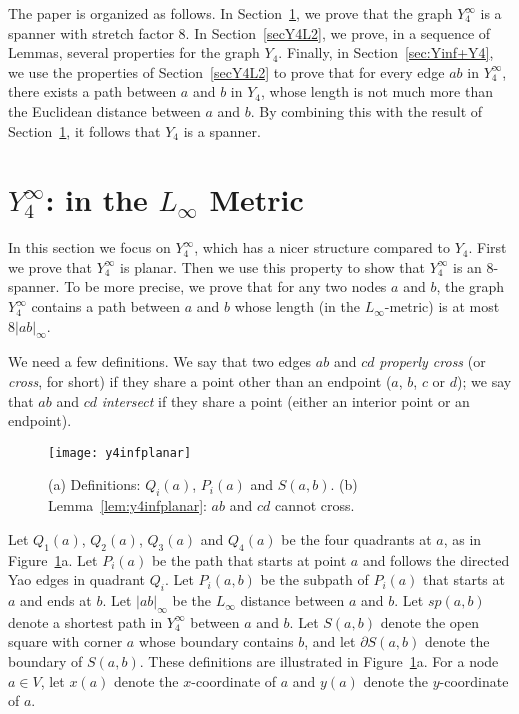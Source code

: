 \pdfoutput=1  \documentclass[11pt]{article}
\begin{document}
The paper is organized as follows.
In Section~\ref{sec:y4inf}, we prove that the graph $Y^\infty_4$ is a
spanner with stretch factor $8$.
In Section~\ref{secY4L2}, we prove, in a sequence of Lemmas, several
properties for the graph $Y_4$. Finally, in Section~\ref{sec:Yinf+Y4},
we use the properties of Section~\ref{secY4L2} to prove that for every
edge $ab$ in $Y^\infty_4$, there exists a path between $a$ and $b$ in
$Y_4$, whose length is not much more than the Euclidean distance between
$a$ and $b$. By combining this with the result of Section~\ref{sec:y4inf},
it follows that $Y_4$ is a spanner.


\section{$Y^\infty_4$: in the $L_\infty$ Metric}
\label{sec:y4inf}
In this section we focus on $Y^\infty_4$, which has a nicer structure
compared to $Y_4$. First we prove that $Y^\infty_4$ is planar. Then we
use this property to show that $Y^\infty_4$ is an $8$-spanner.
To be more precise, we prove that for any two nodes $a$ and $b$,
the graph $Y^\infty_4$ contains a path between $a$ and $b$ whose
length (in the $L_{\infty}$-metric) is at most $8 |ab|_{\infty}$.

We need a few definitions.
We say that two edges $ab$ and $cd$ \emph{properly cross} (or \emph{cross},
for short) if they share a point other than an endpoint ($a$, $b$, $c$ or $d$);
we say that $ab$ and $cd$ \emph{intersect} if they share a point (either an
interior point or an endpoint).
\begin{figure}[htbp]
\centering
\texttt{[image: y4infplanar]}
\caption{(a) Definitions: $Q_i(a)$, $P_i(a)$ and $S(a,b)$. (b) Lemma~\ref{lem:y4infplanar}: $ab$ and $cd$ cannot cross.}
\label{fig:y4infplanar}
\end{figure}
Let $Q_1(a)$, $Q_2(a)$, $Q_3(a)$ and $Q_4(a)$ be
the four quadrants at $a$, as in Figure~\ref{fig:y4infplanar}a.
Let $P_i(a)$ be the path that starts at point $a$ and follows the directed
Yao edges in quadrant $Q_i$.
Let $P_i(a,b)$ be the subpath of $P_i(a)$ that starts at $a$ and ends at $b$.
Let $|ab|_\infty$ be the $L_\infty$ distance between $a$ and $b$.
Let $sp(a,b)$ denote a shortest path in $Y_4^\infty$ between $a$ and $b$.
Let $S(a,b)$ denote the open square with corner $a$ whose boundary
contains $b$, and let $\partial S(a,b)$ denote the boundary of $S(a,b)$.
These definitions are illustrated in Figure~\ref{fig:y4infplanar}a.
For a node $a \in V$, let $x(a)$ denote the $x$-coordinate of $a$ and
$y(a)$ denote the $y$-coordinate of $a$.
\end{document}

